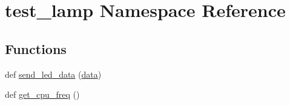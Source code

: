 \hypertarget{namespacetest__lamp}{}\section{test\+\_\+lamp Namespace Reference}
\label{namespacetest__lamp}
\subsection*{Functions}
\begin{DoxyCompactItemize}
\item 
def \hyperlink{namespacetest__lamp_a41c0903d93b79eca9987ad89a509a165}{send\+\_\+led\+\_\+data} (\hyperlink{namespacetest__lamp_a3bbaeee85014b3f126907a5f2437d3a5}{data})
\item 
def \hyperlink{namespacetest__lamp_a0392456bb3af216fb2ddf1f848b47085}{get\+\_\+cpu\+\_\+freq} ()
\end{DoxyCompactItemize}
